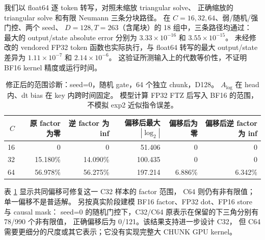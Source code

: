 我们以 float64 逐 token 转写，对照未缩放 triangular solve、
正确缩放的 triangular solve 和有限 Neumann 三条分块路径。
在 \(C=16,32,64\)、弱/随机/强门控、两个 seed、
\(D=128,T=263\)（含尾块）的 18 组中，三条路径均通过：
最大的 output/state absolute error 分别为
\(3.33\times10^{-16}\) 和 \(3.55\times10^{-15}\)。
未经修改的 vendored FP32 token 函数也实际执行，与 float64 转写的最大
output/state 差异为 \(1.11\times10^{-7}\) 和 \(2.14\times10^{-6}\)。
这验证所测输入上的代数等价性，不证明 BF16 kernel 精度或运行时间。

\begin{table}[htbp]\centering\small
\begin{tabular}{rrrrrr}\toprule
\(C\)&原 factor 为零&逆 factor 为 inf&偏移后最大 \(|\log_2|\)&偏移后为零&偏移后逆 factor 为 inf\\\midrule
16&0&0&51.406&0&0\\
32&15.180\%&14.090\%&100.435&0&0\\
64&56.978\%&56.275\%&197.214&6.886\%&6.342\%\\\bottomrule
\end{tabular}
\caption{修正后的范围诊断：seed=0，随机 gate，64 个独立 chunk，D128。
\(A_{\log}\) 在 head 内、dt bias 在 key 内跨时间固定。
模型计算 FP32 FTZ 后写入 BF16 的范围，不模拟 exp2 近似指令误差。}
\label{tab:range}
\end{table}

表 \ref{tab:range} 显示共同偏移可修复这一 C32 样本的 factor 范围，
C64 则仍有非有限值；单一偏移不是普适解。
另按真实阶段建模 BF16 factor、FP32 dot、FP16 store 与 causal mask：
seed=0 的随机门控下，C32/C64 原表示在保留的下三角分别有 78/990 个非有限值，
正确偏移后为 0/121。该结果支持进一步设计 C32，
但 C64 需要更细分的尺度或其它表示；它没有实现完整大 CHUNK GPU kernel。
